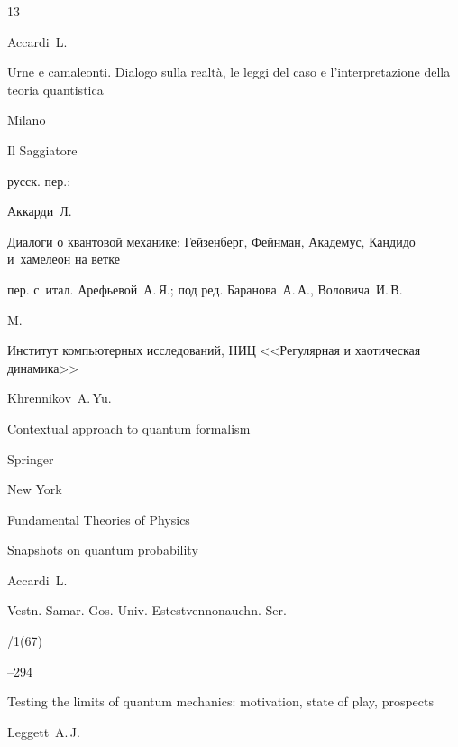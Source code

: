 \begin{thebibliography}{13}

\by Accardi~L.

\book Urne e camaleonti. Dialogo sulla realt\`a, le leggi del caso e l'interpretazione della teoria quantistica

\publaddr Milano 

\publ Il Saggiatore



\rtransl русск. пер.:~

\by Аккарди~Л. 

\book Диалоги о квантовой механике: Гейзенберг, Фейнман, Академус, Кандидо и~хамелеон на ветке

\miscnote пер. с~итал. Арефьевой~А.\,Я.; под ред. Баранова~А.\,А., Воловича~И.\,В.

 \publaddr M. 

 \publ Институт компьютерных исследований, НИЦ <<Регулярная и хаотическая динамика>>






\by Khrennikov~A.\,Yu. 

\book Contextual approach to quantum formalism 

\publ Springer 

\publaddr New York



\serial Fundamental Theories of Physics







\paper Snapshots on quantum probability 

\by Accardi~L. 

\jour Vestn. Samar. Gos. Univ. Estest\-venno\-nau\-chn. Ser.


/1(67)

--294




\paper  Testing the limits of quantum mechanics: motivation, state of play, prospects 

\by Leggett~A.\,J. 


\end{thebibliography}
